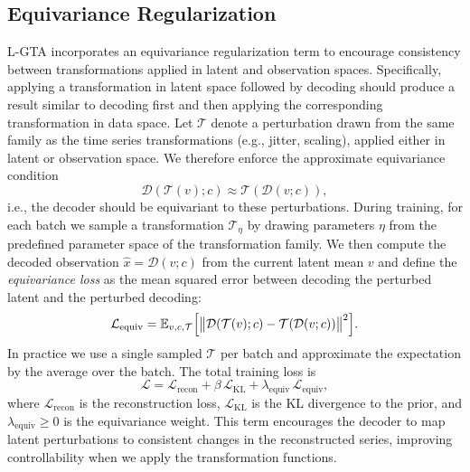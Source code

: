 \subsection{Equivariance Regularization}
\label{chap:equivariance}

L-GTA incorporates an equivariance regularization term to encourage consistency between transformations applied in latent and observation spaces. Specifically, applying a transformation in latent space followed by decoding should produce a result similar to decoding first and then applying the corresponding transformation in data space. Let $\mathcal{T}$ denote a perturbation drawn from the same family as the time series transformations (e.g., jitter, scaling), applied either in latent or observation space. We therefore enforce the approximate equivariance condition
\begin{equation}
\mathcal{D}(\mathcal{T}(v); c) \approx \mathcal{T}(\mathcal{D}(v; c)),
\end{equation}
i.e., the decoder should be equivariant to these perturbations. During training, for each batch we sample a transformation $\mathcal{T}_{\eta}$ by drawing parameters $\eta$ from the predefined parameter space of the transformation family. We then compute the decoded observation $\hat{x} = \mathcal{D}(v; c)$ from the current latent mean $v$ and define the \emph{equivariance loss} as the mean squared error between decoding the perturbed latent and the perturbed decoding:
\begin{equation}
\mathcal{L}_{\mathrm{equiv}} = \mathbb{E}_{v,c,\mathcal{T}}\Bigl[ \bigl\| \mathcal{D}(\mathcal{T}(v); c) - \mathcal{T}(\mathcal{D}(v; c)) \bigr\|^2 \Bigr].
\end{equation}
In practice we use a single sampled $\mathcal{T}$ per batch and approximate the expectation by the average over the batch. The total training loss is
\begin{equation}
\mathcal{L} = \mathcal{L}_{\mathrm{recon}} + \beta \, \mathcal{L}_{\mathrm{KL}} + \lambda_{\mathrm{equiv}} \, \mathcal{L}_{\mathrm{equiv}},
\end{equation}
where $\mathcal{L}_{\mathrm{recon}}$ is the reconstruction loss, $\mathcal{L}_{\mathrm{KL}}$ is the KL divergence to the prior, and $\lambda_{\mathrm{equiv}} \geq 0$ is the equivariance weight. This term encourages the decoder to map latent perturbations to consistent changes in the reconstructed series, improving controllability when we apply the transformation functions.



